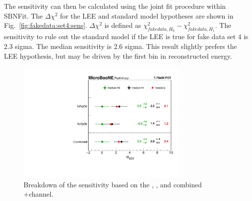 The sensitivity can then be calculated using the joint fit procedure within SBNFit. The $\Delta \chi^{2}$ for the LEE and standard model hypotheses are shown in Fig.~\ref{fig:fakedata:set4:sens}.  $\Delta \chi^{2}$ is defined as $\chi^{2}_{fakedata, H_{0}}-\chi^{2}_{fakedata, H_{1}}$. The sensitivity to rule out the standard model if the LEE is true for fake data set 4 is 2.3 sigma.  The median sensitivity is 2.6 sigma. This result slightly prefers the LEE hypothesis, but may be driven by the first bin in reconstructed energy.

\begin{figure}[H]
\begin{center}
\includegraphics[width=0.75\textwidth]{Fakedata/set4/plotSig_constrained_set4.pdf}
\caption{\label{fig:fakedata:set4:combinedSig} Breakdown of the sensitivity based on the \npsel, \zpsel, and combined \npsel+\zpsel channel.}
\end{center}
\end{figure}

